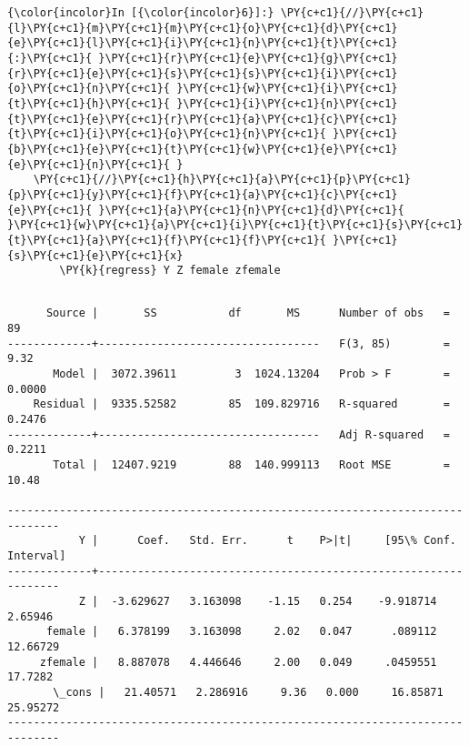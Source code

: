 \documentclass[11pt,notitlepage]{article}\usepackage[]{graphicx}\usepackage[]{color}
\makeatletter
\newenvironment{kframe}{%
 \def\at@end@of@kframe{}%
 \ifinner\ifhmode%
  \def\at@end@of@kframe{\end{minipage}}%
  \begin{minipage}{\columnwidth}%
 \fi\fi%
 \def\FrameCommand##1{\hskip\@totalleftmargin \hskip-\fboxsep
 \colorbox{shadecolor}{##1}\hskip-\fboxsep
     \hskip-\linewidth \hskip-\@totalleftmargin \hskip\columnwidth}%
 \MakeFramed {\advance\hsize-\width
   \@totalleftmargin\z@ \linewidth\hsize
   \@setminipage}}%
 {\par\unskip\endMakeFramed%
 \at@end@of@kframe}
\newenvironment{knitrout}{}{} %
\makeatother
\begin{document}
\begin{enumerate}[a)]
\begin{knitrout}
\begin{kframe}
    \begin{Verbatim}[commandchars=\\\{\}]
{\color{incolor}In [{\color{incolor}6}]:} \PY{c+c1}{//}\PY{c+c1}{l}\PY{c+c1}{m}\PY{c+c1}{m}\PY{c+c1}{o}\PY{c+c1}{d}\PY{c+c1}{e}\PY{c+c1}{l}\PY{c+c1}{i}\PY{c+c1}{n}\PY{c+c1}{t}\PY{c+c1}{:}\PY{c+c1}{ }\PY{c+c1}{r}\PY{c+c1}{e}\PY{c+c1}{g}\PY{c+c1}{r}\PY{c+c1}{e}\PY{c+c1}{s}\PY{c+c1}{s}\PY{c+c1}{i}\PY{c+c1}{o}\PY{c+c1}{n}\PY{c+c1}{ }\PY{c+c1}{w}\PY{c+c1}{i}\PY{c+c1}{t}\PY{c+c1}{h}\PY{c+c1}{ }\PY{c+c1}{i}\PY{c+c1}{n}\PY{c+c1}{t}\PY{c+c1}{e}\PY{c+c1}{r}\PY{c+c1}{a}\PY{c+c1}{c}\PY{c+c1}{t}\PY{c+c1}{i}\PY{c+c1}{o}\PY{c+c1}{n}\PY{c+c1}{ }\PY{c+c1}{b}\PY{c+c1}{e}\PY{c+c1}{t}\PY{c+c1}{w}\PY{c+c1}{e}\PY{c+c1}{e}\PY{c+c1}{n}\PY{c+c1}{ }
	\PY{c+c1}{//}\PY{c+c1}{h}\PY{c+c1}{a}\PY{c+c1}{p}\PY{c+c1}{p}\PY{c+c1}{y}\PY{c+c1}{f}\PY{c+c1}{a}\PY{c+c1}{c}\PY{c+c1}{e}\PY{c+c1}{ }\PY{c+c1}{a}\PY{c+c1}{n}\PY{c+c1}{d}\PY{c+c1}{ }\PY{c+c1}{w}\PY{c+c1}{a}\PY{c+c1}{i}\PY{c+c1}{t}\PY{c+c1}{s}\PY{c+c1}{t}\PY{c+c1}{a}\PY{c+c1}{f}\PY{c+c1}{f}\PY{c+c1}{ }\PY{c+c1}{s}\PY{c+c1}{e}\PY{c+c1}{x}
        \PY{k}{regress} Y Z female zfemale
\end{Verbatim}

    \begin{Verbatim}[commandchars=\\\{\}]

      Source |       SS           df       MS      Number of obs   =        89
-------------+----------------------------------   F(3, 85)        =      9.32
       Model |  3072.39611         3  1024.13204   Prob > F        =    0.0000
    Residual |  9335.52582        85  109.829716   R-squared       =    0.2476
-------------+----------------------------------   Adj R-squared   =    0.2211
       Total |  12407.9219        88  140.999113   Root MSE        =     10.48

------------------------------------------------------------------------------
           Y |      Coef.   Std. Err.      t    P>|t|     [95\% Conf. Interval]
-------------+----------------------------------------------------------------
           Z |  -3.629627   3.163098    -1.15   0.254    -9.918714     2.65946
      female |   6.378199   3.163098     2.02   0.047      .089112    12.66729
     zfemale |   8.887078   4.446646     2.00   0.049     .0459551     17.7282
       \_cons |   21.40571   2.286916     9.36   0.000     16.85871    25.95272
------------------------------------------------------------------------------

    \end{Verbatim}


\end{kframe}
\end{knitrout}
\end{enumerate}
\end{document}
